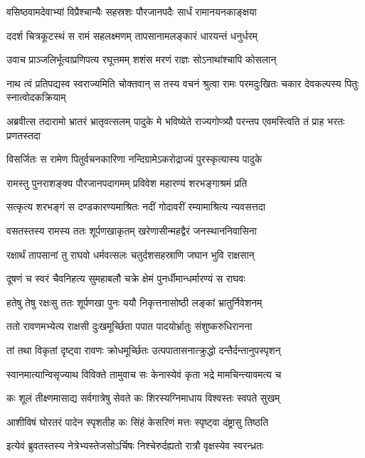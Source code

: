 \twolineshloka
{वसिष्ठवामदेवाभ्यां विप्रैश्चान्यैः सहस्रशः}
{पौरजानपदैः सार्धं रामानयनकाङ्क्षया}


\twolineshloka
{ददर्श चित्रकूटस्थं स रामं सहलक्ष्मणम्}
{तापसानामलङ्कारं धारयन्तं धनुर्धरम्}


\twolineshloka
{उवाच प्राञ्जलिर्भूत्वाप्रणिपत्य रघूत्तमम्}
{शशंस मरणं राज्ञः सोऽनाथांश्चापि कोसलान्}


नाथ त्वं प्रतिपद्यस्व स्वराज्यमिति चोक्तवान्
\twolineshloka
{स तस्य वचनं श्रुत्वा रामः परमदुःखितः}
{चकार देवकल्पस्य पितुः स्नात्वोदकक्रियाम्}


\threelineshloka
{अब्रवीत्स तदारामो भ्रातरं भ्रातृवत्सलम्}
{पादुके मे भविष्येते राज्यगोप्त्र्यौ परन्तप}
{एवमस्त्विति तं प्राह भरतः प्रणतस्तदा}


\twolineshloka
{विसर्जितः स रामेण पितुर्वचनकारिणा}
{नन्दिग्रामेऽकरोद्राज्यं पुरस्कृत्यास्य पादुके}


\twolineshloka
{रामस्तु पुनराशङ्क्य पौरजानपदागमम्}
{प्रविवेश महारण्यं शरभङ्गाश्रमं प्रति}


\twolineshloka
{सत्कृत्य शरभङ्गं स दण्डकारण्यमाश्रितः}
{नदीं गोदावरीं रम्यामाश्रित्य न्यवसत्तदा}


\twolineshloka
{वसतस्तस्य रामस्य ततः शूर्पणखाकृतम्}
{खरेणासीन्महद्वैरं जनस्थाननिवासिना}


\twolineshloka
{रक्षार्थं तापसानां तु राघवो धर्मवत्सलः}
{चतुर्दशसहस्राणि जघान भुवि राक्षसान्}


\twolineshloka
{दूषणं च स्वरं चैवनिहत्य सुमहाबलौ}
{चक्रे क्षेमं पुनर्धीमान्धर्मारण्यं स राघवः}


\twolineshloka
{हतेषु तेषु रक्षःसु ततः शूर्पणखा पुनः}
{ययौ निकृत्तनासोष्ठी लङ्कां भ्रातुर्निवेशनम्}


\twolineshloka
{ततो रावणमभ्येत्य राक्षसी दुःखमूर्च्छिता}
{पपात पादयोर्भ्रातुः संशुष्करुधिरानना}


\twolineshloka
{तां तथा विकृतां दृष्ट्वा रावणः क्रोधमूर्च्छितः}
{उत्पपातासनात्क्रुद्धो दन्तैर्दन्तानुपस्पृशन्}


\twolineshloka
{स्वानमात्यान्विसृज्याथ विविक्ते तामुवाच सः}
{केनास्येवं कृता भद्रे मामचिन्त्यावमत्य च}


\twolineshloka
{कः शूलं तीक्ष्णमासाद्य सर्वगात्रेषु सेवते}
{कः शिरस्यग्निमाधाय विश्वस्तः स्वपते सुखम्}


\twolineshloka
{आशीविषं घोरतरं पादेन स्पृशतीह कः}
{सिंहं केसरिणं मत्तः स्पृष्ट्वा दंष्ट्रासु तिष्ठति}


\twolineshloka
{इत्येवं ब्रुवतस्तस्य नेत्रेभ्यस्तेजसोऽर्चिषः}
{निश्चेरुर्दह्यतो रात्रौ वृक्षस्येव स्वरन्ध्रतः}


